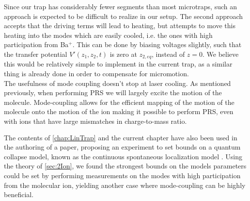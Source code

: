 Since our trap has considerably fewer segments than most microtraps, such an approach is expected to be difficult to realize in our setup.
The second approach accepts that the driving terms will lead to heating, but attempts to move this heating into the modes which are easily cooled, i.e. the ones with high participation from Ba$^+$. This can be done by biasing voltages slightly, such that the transfer potential $V'(z_1,z_2,t)$ is zero at $z_{2,eq}$, instead of $z=0$.
We believe this would be relatively simple to implement in the current trap, as a similar thing is already done in order to compensate for micromotion.\\


The usefulness of mode coupling doesn't stop at laser cooling. As mentioned previously, when performing PRS we will largely excite the motion of the molecule. Mode-coupling allows for the efficient mapping of the motion of the molecule onto the motion of the ion making it possible to perform PRS, even with ions that have large mismatches in charge-to-mass ratio.


The contents of \cref{chap:LinTrap} and the current chapter have also been used in the authoring of a paper, proposing an experiment to set bounds on a quantum collapse model, known as the continuous spontaneous localization model \cite{lenlereriksen2023testing}. Using the theory of \cref{sec:2Ion}, we found the strongest bounds on the models parameters could be set by performing measurements on the modes with high participation from the molecular ion, yielding another case where mode-coupling can be highly beneficial.
